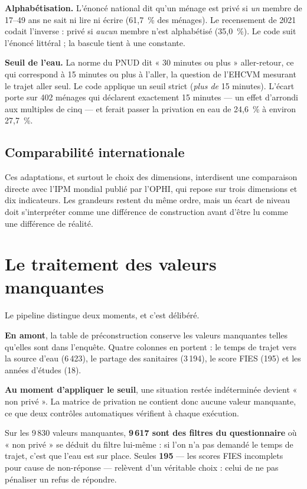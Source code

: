 \documentclass[11pt,a4paper]{article}
\begin{document}
\begin{attention}
\textbf{Alphabétisation.} L'énoncé national dit qu'un ménage est privé si \emph{un} membre de
17--49 ans ne sait ni lire ni écrire (61,7~\% des ménages). Le recensement de 2021 codait
l'inverse : privé si \emph{aucun} membre n'est alphabétisé (35,0~\%). Le code suit l'énoncé
littéral ; la bascule tient à une constante.

\medskip
\textbf{Seuil de l'eau.} La norme du PNUD dit « 30 minutes ou plus » aller-retour, ce qui
correspond à 15 minutes ou plus à l'aller, la question de l'EHCVM mesurant le trajet aller seul.
Le code applique un seuil strict (\emph{plus de} 15 minutes). L'écart porte sur 402 ménages qui
déclarent exactement 15 minutes --- un effet d'arrondi aux multiples de cinq --- et ferait passer
la privation en eau de 24,6~\% à environ 27,7~\%.
\end{attention}

\subsection{Comparabilité internationale}

Ces adaptations, et surtout le choix des dimensions, interdisent une comparaison directe avec
l'IPM mondial publié par l'OPHI, qui repose sur trois dimensions et dix indicateurs. Les
grandeurs restent du même ordre, mais un écart de niveau doit s'interpréter comme une différence
de construction avant d'être lu comme une différence de réalité.

\section{Le traitement des valeurs manquantes}

Le pipeline distingue deux moments, et c'est délibéré.

\textbf{En amont}, la table de préconstruction conserve les valeurs manquantes telles qu'elles
sont dans l'enquête. Quatre colonnes en portent : le temps de trajet vers la source d'eau
(6\,423), le partage des sanitaires (3\,194), le score FIES (195) et les années d'études (18).

\textbf{Au moment d'appliquer le seuil}, une situation restée indéterminée devient « non privé ».
La matrice de privation ne contient donc aucune valeur manquante, ce que deux contrôles
automatiques vérifient à chaque exécution.

Sur les 9\,830 valeurs manquantes, \textbf{9\,617 sont des filtres du questionnaire} où « non
privé » se déduit du filtre lui-même : si l'on n'a pas demandé le temps de trajet, c'est que l'eau
est sur place. Seules \textbf{195} --- les scores FIES incomplets pour cause de non-réponse ---
relèvent d'un véritable choix : celui de ne pas pénaliser un refus de répondre.
\end{document}
